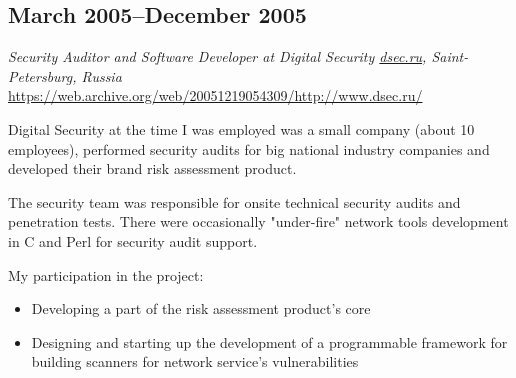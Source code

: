 \subsection*{March 2005--December 2005}

\textit{Security Auditor and Software Developer at Digital Security
\href{https://dsec.ru}{\url{dsec.ru}}, Saint-Petersburg, Russia}
\href{https://web.archive.org/web/20051219054309/http://www.dsec.ru/}{\url{https://web.archive.org/web/20051219054309/http://www.dsec.ru/}}

Digital Security at the time I was employed was a small company (about
10 employees), performed security audits for big national industry
companies and developed their brand risk assessment product.

The security team was responsible for onsite technical security audits
and penetration tests. There were occasionally "under-fire" network
tools development in C and Perl for security audit support.

My participation in the project:
\begin{itemize}[noitemsep, nosep]
  \item Developing a part of the risk assessment product's core
  \item Designing and starting up the development of a programmable
framework for building scanners for network service's vulnerabilities
\end{itemize}
